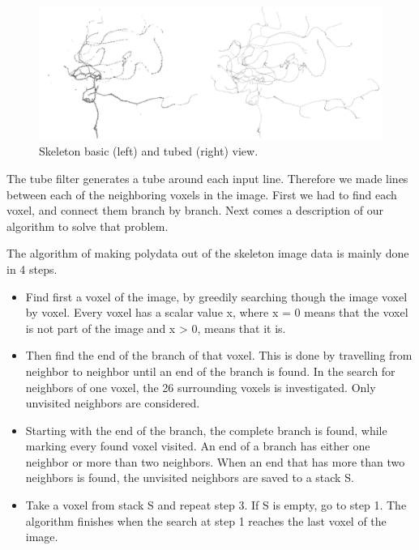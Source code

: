 \begin{figure}
	\centering
	\includegraphics[scale=0.35]{fig/skeleton-basic-tubed}
	\caption{Skeleton basic (left) and tubed (right) view.}\label{fig:skeleton-basic-tubed}
\end{figure}

The tube filter generates a tube around each input line. Therefore we made lines between each of the neighboring voxels in the image. First we had to find each voxel, and connect them branch by branch. Next comes a description of our algorithm to solve that problem.

The algorithm of making polydata out of the skeleton image data is mainly done in 4 steps.
\begin{itemize}

\item Find first a voxel of the image, by greedily searching though the image voxel by voxel. Every voxel has a scalar value x, where x = 0 means that the voxel is not part of the image and x > 0, means that it is. 

\item Then find the end of the branch of that voxel. This is done by travelling from neighbor to neighbor until an end of the branch is found. In the search for neighbors of one voxel, the 26 surrounding voxels is investigated. Only unvisited neighbors are considered.

\item Starting with the end of the branch, the complete branch is found, while marking every found voxel visited. An end of a branch has either one neighbor or more than two neighbors. When an end that has more than two neighbors is found, the unvisited neighbors are saved to a stack S.

\item Take a voxel from stack S and repeat step 3. If S is empty, go to step 1. The algorithm finishes when the search at step 1 reaches the last voxel of the image.

\end{itemize}

